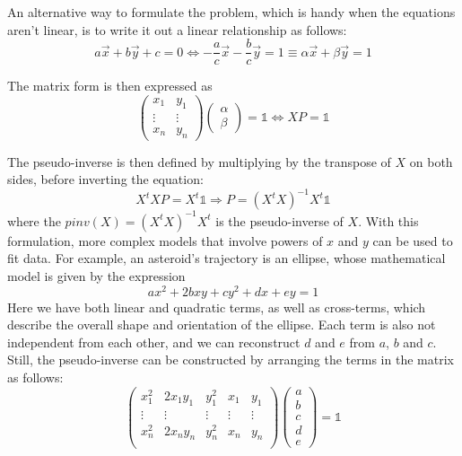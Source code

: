 An alternative way to formulate the problem, which is handy when the equations aren't linear, is to write it out a linear relationship as follows:
\begin{equation}
    a\vec{x} + b\vec{y} + c = 0 \Leftrightarrow -\frac{a}{c} \vec{x} - \frac{b}{c} \vec{y} = 1 \equiv \alpha \vec{x} + \beta \vec{y} = 1 
\end{equation}

The matrix form is then expressed as
\begin{equation}
    \begin{pmatrix}
        x_1 & y_1 \\
        \vdots & \vdots \\
        x_n & y_n 
    \end{pmatrix} 
    \begin{pmatrix}
        \alpha \\
        \beta
    \end{pmatrix}
    = \mathbb{1} 
    \Leftrightarrow
    X P = \mathbb{1}
\end{equation}

The pseudo-inverse is then defined by multiplying by the transpose of $X$ on both sides, before inverting the equation:
\begin{equation}
    X^t X P = X^t \mathbb{1} \Rightarrow P = (X^t X)^{-1} X^t \mathbb{1}
\end{equation}
where the $pinv(X) = (X^t X)^{-1} X^t$ is the pseudo-inverse of $X$. With this formulation, more complex models that involve powers of $x$ and $y$ can be used to fit data. For example, an asteroid's trajectory is an ellipse, whose mathematical model is given by the expression
\begin{equation}
    a x^2 + 2 b x y + c y^2 + d x + e y = 1
    \label{eq:conicSectionRotated}
\end{equation}
Here we have both linear and quadratic terms, as well as cross-terms, which describe the overall shape and orientation of the ellipse. Each term is also not independent from each other, and we can reconstruct $d$ and $e$ from $a$, $b$ and $c$. Still, the pseudo-inverse can be constructed by arranging the terms in the matrix as follows:
\begin{equation}
    \begin{pmatrix}
        x_1^2  & 2 x_1 y_1 & y_1^2  & x_1    & y_1 \\
        \vdots & \vdots    & \vdots & \vdots & \vdots \\
        x_n^2  & 2 x_n y_n & y_n^2  & x_n    & y_n \\
    \end{pmatrix}
    \begin{pmatrix}
        a \\ b \\ c \\ d \\ e 
    \end{pmatrix} = \mathbb{1} 
\end{equation}

